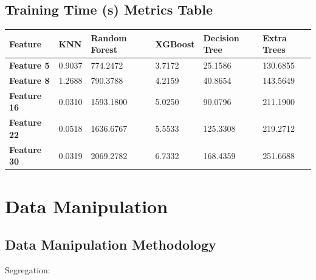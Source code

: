 \documentclass[letterpaper]{article}
\begin{document}
\bigskip

\subsection{Training Time (s) Metrics Table}
\begin{flushleft}
\tablefirsthead{}
\tablehead{}
\tabletail{}
\tablelasttail{}
\begin{supertabular}{|m{0.7677598in}|m{0.49135986in}|m{1.0830599in}|m{0.66565984in}|m{0.9497598in}|m{0.8309598in}|}
\hline
{\bfseries Feature} &
{\bfseries KNN} &
{\bfseries Random Forest} &
{\bfseries XGBoost} &
{\bfseries Decision Tree} &
{\bfseries Extra Trees}\\\hline
{\bfseries Feature 5} &
0.9037 &
774.2472 &
3.7172 &
25.1586 &
130.6855\\\hline
{\bfseries Feature 8} &
1.2688 &
790.3788 &
4.2159 &
40.8654 &
143.5649\\\hline
{\bfseries Feature 16} &
0.0310 &
1593.1800 &
5.0250 &
90.0796 &
211.1900\\\hline
{\bfseries Feature 22} &
0.0518 &
1636.6767 &
5.5533 &
125.3308 &
219.2712\\\hline
{\bfseries Feature 30} &
0.0319 &
2069.2782 &
6.7332 &
168.4359 &
251.6688\\\hline
\end{supertabular}
\end{flushleft}

\bigskip


\bigskip


\bigskip


\bigskip


\bigskip


\bigskip


\bigskip


\bigskip


\bigskip


\bigskip


\bigskip


\bigskip


\bigskip

\section[Data Manipulation]{\textbf{Data Manipulation}}

\bigskip

\subsection{Data Manipulation Methodology}
Segregation:
\end{document}
